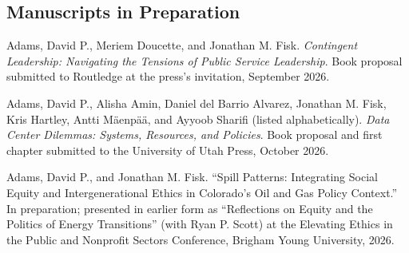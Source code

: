 \documentclass[11pt,letterpaper]{article}
\renewenvironment{itemize}{
  \begin{list}{}{
    \setlength{\leftmargin}{1.5em}
    \setlength{\itemsep}{0.25em}
    \setlength{\parskip}{0pt}
    \setlength{\parsep}{0.25em}
  }
}{
  \end{list}
}
\begin{document}
\subsection*{Manuscripts in Preparation}
\begin{itemize} \leftmargin=2pt\itemindent=-15pt\leftmargin=2pt\itemindent=-15pt
    \item Adams, David P., Meriem Doucette, and Jonathan M. Fisk. \emph{Contingent Leadership: Navigating the Tensions of Public Service Leadership}. Book proposal submitted to Routledge at the press's invitation, September 2026.

    \item Adams, David P., Alisha Amin, Daniel del Barrio Alvarez, Jonathan M. Fisk, Kris Hartley, Antti Mäenpää, and Ayyoob Sharifi (listed alphabetically). \emph{Data Center Dilemmas: Systems, Resources, and Policies}. Book proposal and first chapter submitted to the University of Utah Press, October 2026.

    \item Adams, David P., and Jonathan M. Fisk. ``Spill Patterns: Integrating Social Equity and Intergenerational Ethics in Colorado's Oil and Gas Policy Context.'' In preparation; presented in earlier form as ``Reflections on Equity and the Politics of Energy Transitions'' (with Ryan P. Scott) at the Elevating Ethics in the Public and Nonprofit Sectors Conference, Brigham Young University, 2026.
\end{itemize}
\end{document}
